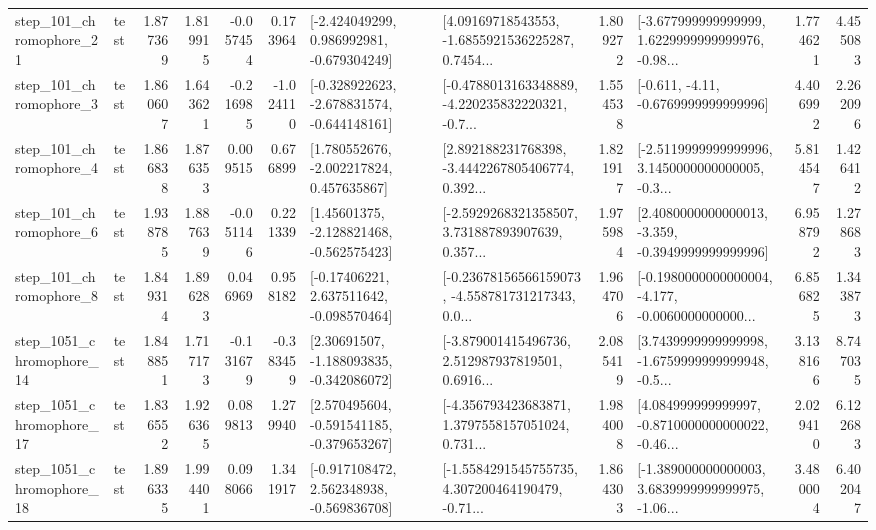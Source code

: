 \begin{tabular}{llrrrrllrlrr}
  step\_101\_chromophore\_21 &      test &      1.877369 &    1.819915 &     -0.057454 &  0.173964 &   [-2.424049299, 0.986992981, -0.679304249] &  [4.09169718543553, -1.6855921536225287, 0.7454... &       1.809272 &  [-3.677999999999999, 1.6229999999999976, -0.98... &            1.774621 &          4.455083 \\
   step\_101\_chromophore\_3 &      test &      1.860607 &    1.643621 &     -0.216985 & -1.024110 &  [-0.328922623, -2.678831574, -0.644148161] &  [-0.4788013163348889, -4.220235832220321, -0.7... &       1.554538 &               [-0.611, -4.11, -0.6769999999999996] &            4.406992 &          2.262096 \\
   step\_101\_chromophore\_4 &      test &      1.866838 &    1.876353 &      0.009515 &  0.676899 &    [1.780552676, -2.002217824, 0.457635867] &  [2.892188231768398, -3.4442267805406774, 0.392... &       1.821917 &  [-2.5119999999999996, 3.1450000000000005, -0.3... &            5.814547 &          1.426412 \\
   step\_101\_chromophore\_6 &      test &      1.938785 &    1.887639 &     -0.051146 &  0.221339 &    [1.45601375, -2.128821468, -0.562575423] &  [-2.5929268321358507, 3.731887893907639, 0.357... &       1.975984 &  [2.4080000000000013, -3.359, -0.3949999999999996] &            6.958792 &          1.278683 \\
   step\_101\_chromophore\_8 &      test &      1.849314 &    1.896283 &      0.046969 &  0.958182 &    [-0.17406221, 2.637511642, -0.098570464] &  [-0.23678156566159073, -4.558781731217343, 0.0... &       1.964706 &  [-0.1980000000000004, -4.177, -0.0060000000000... &            6.856825 &          1.343873 \\
 step\_1051\_chromophore\_14 &      test &      1.848851 &    1.717173 &     -0.131679 & -0.383459 &    [2.30691507, -1.188093835, -0.342086072] &  [-3.879001415496736, 2.512987937819501, 0.6916... &       2.085419 &  [3.7439999999999998, -1.6759999999999948, -0.5... &            3.138166 &          8.747035 \\
 step\_1051\_chromophore\_17 &      test &      1.836552 &    1.926365 &      0.089813 &  1.279940 &   [2.570495604, -0.591541185, -0.379653267] &  [-4.356793423683871, 1.3797558157051024, 0.731... &       1.984008 &  [4.084999999999997, -0.8710000000000022, -0.46... &            2.029410 &          6.122683 \\
 step\_1051\_chromophore\_18 &      test &      1.896335 &    1.994401 &      0.098066 &  1.341917 &   [-0.917108472, 2.562348938, -0.569836708] &  [-1.5584291545755735, 4.307200464190479, -0.71... &       1.864303 &  [-1.389000000000003, 3.6839999999999975, -1.06... &            3.480004 &          6.402047 \\

\end{tabular}

